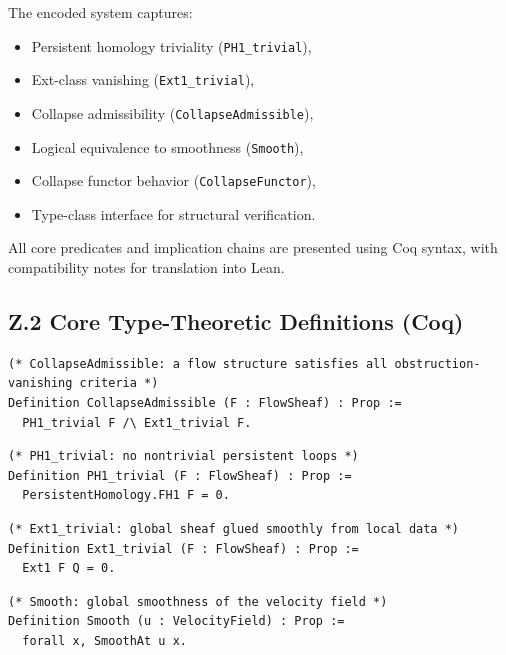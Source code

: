 \documentclass[11pt]{article}
\begin{document}
The encoded system captures:
\begin{itemize}
  \item Persistent homology triviality (\texttt{PH1\_trivial}),
  \item Ext-class vanishing (\texttt{Ext1\_trivial}),
  \item Collapse admissibility (\texttt{CollapseAdmissible}),
  \item Logical equivalence to smoothness (\texttt{Smooth}),
  \item Collapse functor behavior (\texttt{CollapseFunctor}),
  \item Type-class interface for structural verification.
\end{itemize}

All core predicates and implication chains are presented using Coq syntax, with compatibility notes for translation into Lean.

\subsection*{Z.2 Core Type-Theoretic Definitions (Coq)}

\begin{lstlisting}[language=Coq, caption={Collapse Admissibility Predicate}]
(* CollapseAdmissible: a flow structure satisfies all obstruction-vanishing criteria *)
Definition CollapseAdmissible (F : FlowSheaf) : Prop :=
  PH1_trivial F /\ Ext1_trivial F.
\end{lstlisting}

\begin{lstlisting}[language=Coq, caption={Persistent Homology Collapse Condition}]
(* PH1_trivial: no nontrivial persistent loops *)
Definition PH1_trivial (F : FlowSheaf) : Prop :=
  PersistentHomology.FH1 F = 0.
\end{lstlisting}

\begin{lstlisting}[language=Coq, caption={Ext-Class Collapse Condition}]
(* Ext1_trivial: global sheaf glued smoothly from local data *)
Definition Ext1_trivial (F : FlowSheaf) : Prop :=
  Ext1 F Q = 0.
\end{lstlisting}

\begin{lstlisting}[language=Coq, caption={Smoothness Predicate}]
(* Smooth: global smoothness of the velocity field *)
Definition Smooth (u : VelocityField) : Prop :=
  forall x, SmoothAt u x.
\end{lstlisting}
\end{document}
